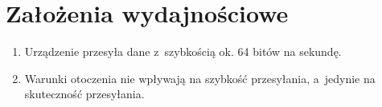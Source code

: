 \documentclass{article}
\begin{document}

\section{Założenia wydajnościowe}
    \begin{enumerate}
        \item Urządzenie przesyła dane z~szybkością ok. 64 bitów na sekundę.
        \item Warunki otoczenia nie wpływają na szybkość przesyłania, a~jedynie 
              na skuteczność przesyłania.
    \end{enumerate}
        
\end{document}
